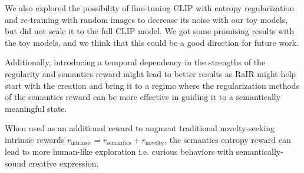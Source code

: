 We also explored the possibility of fine-tuning CLIP with entropy regularization and re-training with random images to decrease its noise with our toy models, but did not scale it to the full CLIP model.
We got some promising results with the toy models, and we think that this could be a good direction for future work.

Additionally, introducing a temporal dependency in the strengths of the regularity and semantics reward might lead to better results as RaIR might help start with the creation and bring it to a regime where the regularization methods of the semantics reward can be more effective in guiding it to a semantically meaningful state.






When used as an additional reward to augment traditional novelty-seeking intrinsic rewards \(r_{\text{intrinsic}} = r_{\text{semantics}} + r_{\text{novelty}}\), the semantics entropy reward can lead to more human-like exploration i.e. curious behaviors with semantically-sound creative expression.



